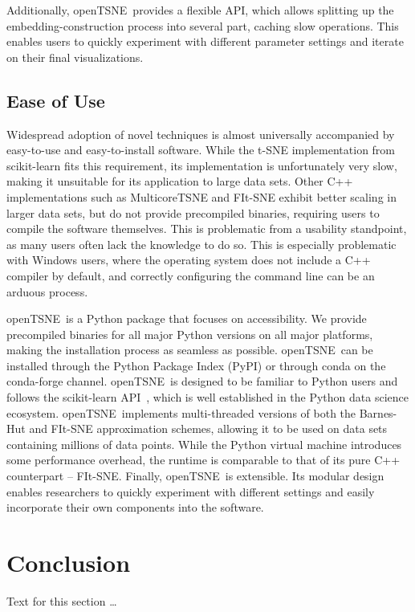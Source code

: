 \documentclass[twocolumn]{bmcart}
\newcommand{\opentsne}{\textsf{openTSNE}}
\begin{document}
Additionally, \opentsne\ provides a flexible API, which allows splitting up the embedding-construction process into several part, caching slow operations. This enables users to quickly experiment with different parameter settings and iterate on their final visualizations.


\subsection*{Ease of Use}

Widespread adoption of novel techniques is almost universally accompanied by easy-to-use and easy-to-install software. While the t-SNE implementation from \textsf{scikit-learn} fits this requirement, its implementation is unfortunately very slow, making it unsuitable for its application to large data sets. Other C++ implementations such as \textsf{MulticoreTSNE} and \textsf{FIt-SNE} exhibit better scaling in larger data sets, but do not provide precompiled binaries, requiring users to compile the software themselves. This is problematic from a usability standpoint, as many users often lack the knowledge to do so. This is especially problematic with Windows users, where the operating system does not include a C++ compiler by default, and correctly configuring the command line can be an arduous process.

\opentsne\ is a Python package that focuses on accessibility. We provide precompiled binaries for all major Python versions on all major platforms, making the installation process as seamless as possible. \opentsne\ can be installed through the Python Package Index (PyPI) or through conda on the conda-forge channel. \opentsne\ is designed to be familiar to Python users and follows the \textsf{scikit-learn} API~\cite{sklearn_api}, which is well established in the Python data science ecosystem. \opentsne\ implements multi-threaded versions of both the Barnes-Hut and FIt-SNE approximation schemes, allowing it to be used on data sets containing millions of data points. While the Python virtual machine introduces some performance overhead, the runtime is comparable to that of its pure C++ counterpart -- \textsf{FIt-SNE}. Finally, \opentsne\ is extensible. Its modular design enables researchers to quickly experiment with different settings and easily incorporate their own components into the software.

\section*{Conclusion}
Text for this section \ldots
\end{document}
